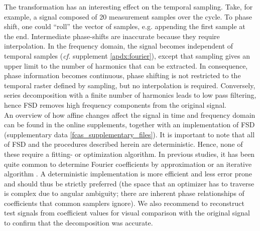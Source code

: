 The transformation has an interesting effect on the temporal sampling.
Take, for example, a signal composed of 20 measurement samples over the cycle.
To phase shift, one could ``roll'' the vector of samples, e.g. appending the first sample at the end.
Intermediate phase-shifts are inaccurate because they require interpolation.
In the frequency domain, the signal becomes independent of temporal samples (\textit{cf.} supplement \ref*{apdx:fourier}), except that sampling gives an upper limit to the number of harmonics that can be extracted.
In consequence, phase information becomes continuous, phase shifting is not restricted to the temporal raster defined by sampling, but no interpolation is required.
Conversely, series decomposition with a finite number of harmonics leads to low pass filtering, hence FSD removes high frequency components from the original signal.
\\An overview of how affine changes affect the signal in time and frequency domain can be found in the online supplements, together with an implementation of FSD (supplementary data \ref{fcas_supplementary_files}).
It is important to note that all of FSD and the procedures described herein are deterministic.
Hence, none of these require a fitting- or optimization algorithm.
In previous studies, it has been quite common to determine Fourier coefficients by approximation \citep[e.g.][]{Alexander1980} or an iterative algorithm \citep[regression, e.g.][]{Hubel2015}.
A deterministic implementation is more efficient and less error prone and should thus be strictly preferred (the space that an optimizer has to traverse is complex due to angular ambiguity; there are inherent phase relationships of coefficients that common samplers ignore).
We also recommend to reconstruct test signals from coefficient values for visual comparison with the original signal to confirm that the decomposition was accurate.



